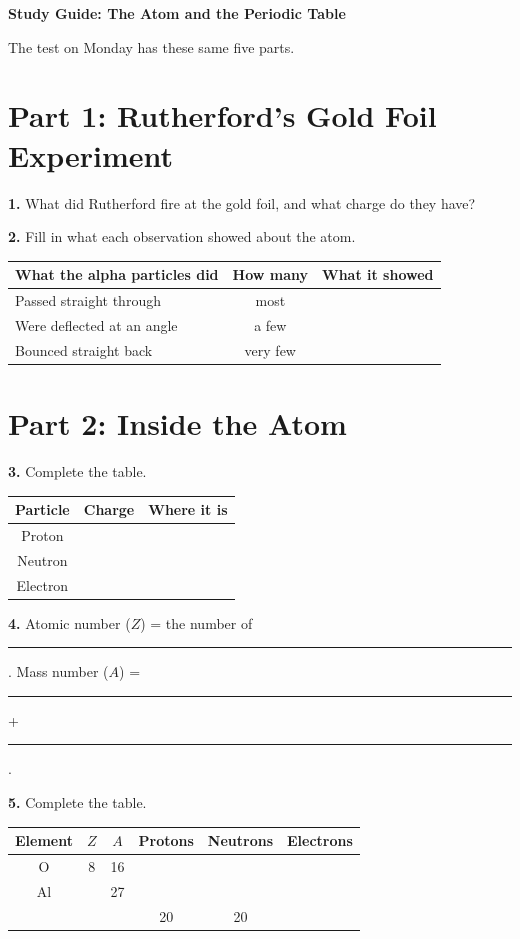 

{\Large\bfseries Study Guide: The Atom and the Periodic Table}\par\nm
The test on Monday has these same five parts.
\section*{Part 1: Rutherford's Gold Foil Experiment}
\textbf{1.} What did Rutherford fire at the gold foil, and what charge do they have?\ans

\textbf{2.} Fill in what each observation showed about the atom.

\begin{tabular}{|p{4.2cm}|c|p{7cm}|}\hline
What the alpha particles did & How many & What it showed\\\hline
Passed straight through & most & \\[12pt]\hline
Were deflected at an angle & a few & \\[12pt]\hline
Bounced straight back & very few & \\[12pt]\hline
\end{tabular}

\section*{Part 2: Inside the Atom}
\textbf{3.} Complete the table.

\begin{tabular}{|c|c|p{5cm}|}\hline
Particle & Charge & Where it is\\\hline
Proton & & \\\hline Neutron & & \\\hline Electron & & \\\hline
\end{tabular}

\textbf{4.} Atomic number ($Z$) = the number of \rule{3cm}{0.4pt}. \quad Mass number ($A$) = \rule{2.5cm}{0.4pt} + \rule{2.5cm}{0.4pt}.

\textbf{5.} Complete the table.

\begin{tabular}{|c|c|c|c|c|c|}\hline
Element & $Z$ & $A$ & Protons & Neutrons & Electrons\\\hline
O & 8 & 16 & & & \\\hline
Al & & 27 & & & \\\hline
 & & & 20 & 20 & \\\hline
\end{tabular}

